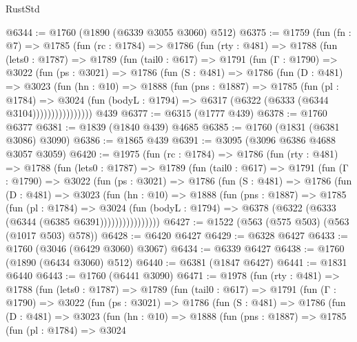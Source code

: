 \begin{lexlean}{RustStd}
\begin{coremodule}
@6344 := @1760 (@1890 (@6339 @3055 @3060) @512)
@6375 := @1759
    (fun (fn : @7) =>
    @1785
      (fun (rc : @1784) =>
      @1786
        (fun (rty : @481) =>
        @1788
          (fun (lets0 : @1787) =>
          @1789
            (fun (tail0 : @617) =>
            @1791
              (fun (Γ : @1790) =>
              @3022
                (fun (ps : @3021) =>
                @1786
                  (fun (S : @481) =>
                  @1786
                    (fun (D : @481) =>
                    @3023
                      (fun (hn : @10) =>
                      @1888
                        (fun (pns : @1887) =>
                        @1785
                          (fun (pl : @1784) =>
                          @3024
                            (fun (bodyL : @1794) => @6317 (@6322 (@6333 (@6344 @3104))))))))))))))))
    @439
@6377 := @6315 (@1777 @439)
@6378 := @1760 @6377
@6381 := @1839 (@1840 @439) @4685
@6385 := @1760 (@1831 (@6381 @3086) @3090)
@6386 := @1865 @439
@6391 := @3095 (@3096 @6386 @4688 @3057 @3059)
@6420 := @1975
    (fun (rc : @1784) =>
    @1786
      (fun (rty : @481) =>
      @1788
        (fun (lets0 : @1787) =>
        @1789
          (fun (tail0 : @617) =>
          @1791
            (fun (Γ : @1790) =>
            @3022
              (fun (ps : @3021) =>
              @1786
                (fun (S : @481) =>
                @1786
                  (fun (D : @481) =>
                  @3023
                    (fun (hn : @10) =>
                    @1888
                      (fun (pns : @1887) =>
                      @1785
                        (fun (pl : @1784) =>
                        @3024
                          (fun (bodyL : @1794) =>
                          @6378 (@6322 (@6333 (@6344 (@6385 @6391))))))))))))))))
@6427 := @1522 (@563 (@575 @503) (@563 (@1017 @503) @578))
@6428 := @6420 @6427
@6429 := @6328 @6427
@6433 := @1760 (@3046 (@6429 @3060) @3067)
@6434 := @6339 @6427
@6438 := @1760 (@1890 (@6434 @3060) @512)
@6440 := @6381 (@1847 @6427)
@6441 := @1831 @6440
@6443 := @1760 (@6441 @3090)
@6471 := @1978
    (fun (rty : @481) =>
    @1788
      (fun (lets0 : @1787) =>
      @1789
        (fun (tail0 : @617) =>
        @1791
          (fun (Γ : @1790) =>
          @3022
            (fun (ps : @3021) =>
            @1786
              (fun (S : @481) =>
              @1786
                (fun (D : @481) =>
                @3023
                  (fun (hn : @10) =>
                  @1888
                    (fun (pns : @1887) =>
                    @1785
                      (fun (pl : @1784) =>
                      @3024

\end{coremodule}
\end{lexlean}
